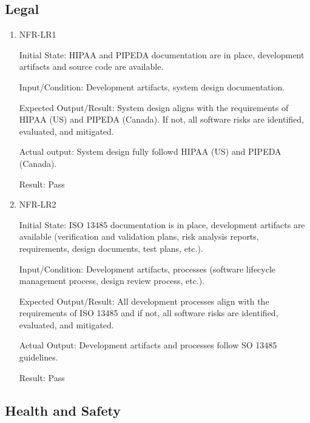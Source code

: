 \documentclass[12pt, titlepage]{article}
\begin{document}
\subsection{Legal}
\begin{enumerate}

  \item{NFR-LR1\\}\label{NFR-LR1}

  Initial State: HIPAA and PIPEDA documentation are in place, development artifacts and source code are available.

  Input/Condition: Development artifacts, system design documentation.

  Expected Output/Result: System design aligns with the requirements of HIPAA (US) and PIPEDA (Canada). If not, all software risks are identified, evaluated, and mitigated.

  Actual output: System design fully followd HIPAA (US) and PIPEDA (Canada). 

  Result: Pass
  \item{NFR-LR2\\}\label{NFR-LR2}

Initial State: ISO 13485 documentation is in place, development artifacts are available (verification and validation plans, risk analysis reports, requirements, design documents, test plans, etc.).

Input/Condition: Development artifacts, processes (software lifecycle management process, design review process, etc.).

Expected Output/Result: All development processes align with the requirements of ISO 13485 and if not, all software risks are identified, evaluated, and mitigated.

Actual Output: Development artifacts and processes follow SO 13485 guidelines.

Result: Pass

\end{enumerate}

\subsection{Health and Safety}
\end{document}
